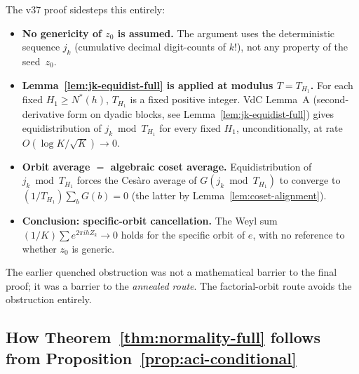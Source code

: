 \documentclass[
]{article}
\begin{document}
The v37 proof sidesteps this entirely:

\begin{itemize}
\item \textbf{No genericity of $z_0$ is assumed.}
  The argument uses the deterministic sequence $j_k$
  (cumulative decimal digit-counts of $k!$), not any property of the
  seed~$z_0$.
\item \textbf{Lemma~\ref{lem:jk-equidist-full} is applied at modulus
  $T = T_{H_1}$.}
  For each fixed $H_1\ge N^*(h)$, $T_{H_1}$ is a fixed positive integer.
  VdC Lemma~A (second-derivative form on dyadic blocks, see
  Lemma~\ref{lem:jk-equidist-full}) gives equidistribution
  of $j_k\bmod T_{H_1}$ for every fixed $H_1$, unconditionally,
  at rate $O(\log K/\sqrt{K})\to 0$.
\item \textbf{Orbit average $=$ algebraic coset average.}
  Equidistribution of $j_k\bmod T_{H_1}$ forces the Cesàro average of
  $G(j_k\bmod T_{H_1})$ to converge to $(1/T_{H_1})\sum_b G(b) = 0$
  (the latter by Lemma~\ref{lem:coset-alignment}).
\item \textbf{Conclusion: specific-orbit cancellation.}
  The Weyl sum $(1/K)\sum e^{2\pi ihZ_k}\to 0$ holds for the specific
  orbit of $e$, with no reference to whether $z_0$ is generic.
\end{itemize}

The earlier quenched obstruction was not a mathematical barrier to the
final proof; it was a barrier to the \emph{annealed route}.
The factorial-orbit route avoids the obstruction entirely.

\subsection{How Theorem~\ref{thm:normality-full} follows from
  Proposition~\ref{prop:aci-conditional}}
\label{sec:how-thm-follows}
\end{document}
